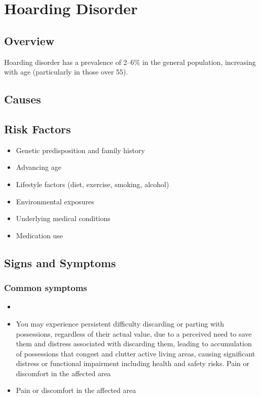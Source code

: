 \chapter{Hoarding Disorder}
\label{sec:Hoarding Disorder}

\section{Overview}
Hoarding disorder has a prevalence of 2--6\% in the general population, increasing with age (particularly in those over 55).
\section{Causes}
\section{Risk Factors}

\begin{itemize}[noitemsep]
  \item Genetic predisposition and family history
  \item Advancing age
  \item Lifestyle factors (diet, exercise, smoking, alcohol)
  \item Environmental exposures
  \item Underlying medical conditions
  \item Medication use
\end{itemize}
\section{Signs and Symptoms}

\subsection{Common symptoms}
\begin{itemize}[noitemsep]
  \item \item You may experience persistent difficulty discarding or parting with possessions, regardless of their actual value, due to a perceived need to save them and distress associated with discarding them, leading to accumulation of possessions that congest and clutter active living areas, causing significant distress or functional impairment including health and safety risks. Pain or discomfort in the affected area    \item Pain or discomfort in the affected area
  \end{itemize}

